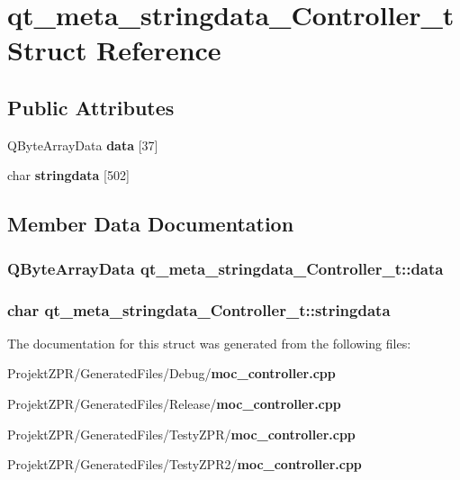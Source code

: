 \section{qt\-\_\-meta\-\_\-stringdata\-\_\-\-Controller\-\_\-t Struct Reference}
\label{structqt__meta__stringdata___controller__t}
\subsection*{Public Attributes}
\begin{DoxyCompactItemize}
\item 
Q\-Byte\-Array\-Data {\bf data} [37]
\item 
char {\bf stringdata} [502]
\end{DoxyCompactItemize}


\subsection{Member Data Documentation}
\subsubsection[{data}]{\setlength{\rightskip}{0pt plus 5cm}Q\-Byte\-Array\-Data qt\-\_\-meta\-\_\-stringdata\-\_\-\-Controller\-\_\-t\-::data}\label{structqt__meta__stringdata___controller__t_a85f61ff9015de00512cc5108f62e86f7}
\subsubsection[{stringdata}]{\setlength{\rightskip}{0pt plus 5cm}char qt\-\_\-meta\-\_\-stringdata\-\_\-\-Controller\-\_\-t\-::stringdata}\label{structqt__meta__stringdata___controller__t_aec181748e9af78d66ac11fbc848719c4}


The documentation for this struct was generated from the following files\-:\begin{DoxyCompactItemize}
\item 
Projekt\-Z\-P\-R/\-Generated\-Files/\-Debug/{\bf moc\-\_\-controller.\-cpp}\item 
Projekt\-Z\-P\-R/\-Generated\-Files/\-Release/{\bf moc\-\_\-controller.\-cpp}\item 
Projekt\-Z\-P\-R/\-Generated\-Files/\-Testy\-Z\-P\-R/{\bf moc\-\_\-controller.\-cpp}\item 
Projekt\-Z\-P\-R/\-Generated\-Files/\-Testy\-Z\-P\-R2/{\bf moc\-\_\-controller.\-cpp}\end{DoxyCompactItemize}
